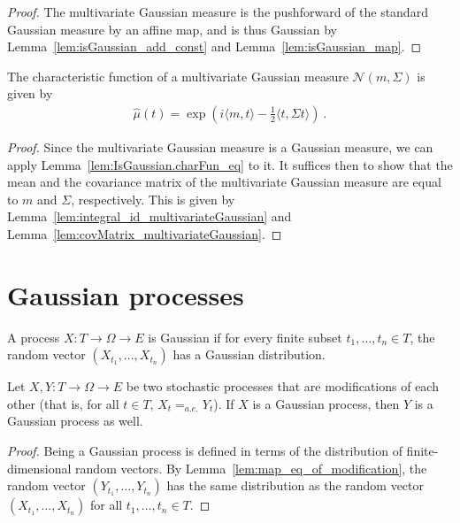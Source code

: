 \begin{proof}
The multivariate Gaussian measure is the pushforward of the standard Gaussian measure by an affine map, and is thus Gaussian by Lemma~\ref{lem:isGaussian_add_const} and Lemma~\ref{lem:isGaussian_map}.
\end{proof}


\begin{theorem}\label{thm:charFun_multivariateGaussian}
The characteristic function of a multivariate Gaussian measure $\mathcal{N}(m, \Sigma)$ is given by
\begin{align*}
  \hat{\mu}(t) = \exp\left(i \langle m, t \rangle - \frac{1}{2} \langle t, \Sigma t \rangle\right)
  \: .
\end{align*}
\end{theorem}

\begin{proof}
Since the multivariate Gaussian measure is a Gaussian measure, we can apply Lemma~\ref{lem:IsGaussian.charFun_eq} to it.
It suffices then to show that the mean and the covariance matrix of the multivariate Gaussian measure are equal to $m$ and $\Sigma$, respectively.
This is given by Lemma~\ref{lem:integral_id_multivariateGaussian} and Lemma~\ref{lem:covMatrix_multivariateGaussian}.
\end{proof}


\section{Gaussian processes}
\label{sec:gaussian_processes}

\begin{definition}\label{def:IsGaussianProcess}
  \leanok
A process $X : T \to \Omega \to E$ is Gaussian if for every finite subset $t_1, \ldots, t_n \in T$, the random vector $(X_{t_1}, \ldots, X_{t_n})$ has a Gaussian distribution.
\end{definition}


\begin{lemma}\label{lem:isGaussianProcess_of_modification}
  \leanok
Let $X, Y : T \to \Omega \to E$ be two stochastic processes that are modifications of each other (that is, for all $t \in T$, $X_t =_{a.e.} Y_t$).
If $X$ is a Gaussian process, then $Y$ is a Gaussian process as well.
\end{lemma}

\begin{proof}
Being a Gaussian process is defined in terms of the distribution of finite-dimensional random vectors.
By Lemma~\ref{lem:map_eq_of_modification}, the random vector $(Y_{t_1}, \ldots, Y_{t_n})$ has the same distribution as the random vector $(X_{t_1}, \ldots, X_{t_n})$ for all $t_1, \ldots, t_n \in T$.
\end{proof}
